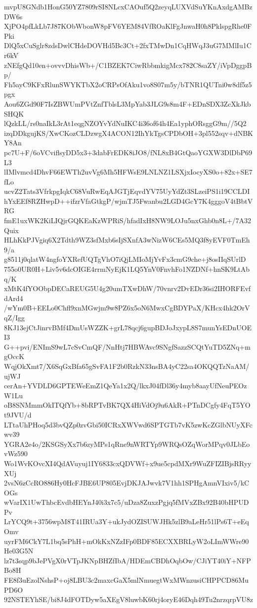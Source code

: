 mvpU8GNdb1HonG50YZ7809rSI8NLcxCAOuf5Q2zeyqLUXVdSuYKnAxdgAMBzDW6s
XjPO4pfLkLb7J87KObWbonW8pFV6YEM84VfROaKlFgJnwaH0h8PklspgRhe0FPki
DlQ5xCuSglr8zdsDwlCHdeDOVHd5Bc3Ct+2fxTMwDn1CqHWqJ3uG7MMlIu1Cr6kV
zNEfgQd10en+ovvvDhisWb+/C1BZEK7CiwRbbmkigMcx782C8saZY/iVpDggpBp/
Fh5ayC9KFxRlunSWYKTbX2oCRPsOfAku1vo8S07m5y/bTNR1QUTni0w8df5z5pgx
Aou6ZGd90F7IsZBWUmPVtZnfTblsL3MpYab3JLG9s8m4F+EDnSDX3ZcXkJkbSHQK
lQzkLL/rs0naIkL3rAt1eqgNZOYvYdNuIKC4i36of64h4Ea1yphORsggG9m//5Q2
izqDDkgujKS/XwCKozCLDzwgX4ACON12IhYkTgsCPDbOH+3pl552sqv+dNBKY8An
pc7U+F/6oVCviflsyDD5x3+3dabFrEDK8iJO8/fNL8xB4GtQaoYGXW3DlDbP69L3
lIMlvmcd4DhvF66EWTh2uvVg6Mh5HFWsE9LNLNZ1LSXjxIocyXS0o+82x+SE7fLo
ucvZ2Tats3VfrkpgIqkC68VuRwEqAJGTjEqvdYV75UyYdZt3SLzeiPS1i19CCLDI
hYxEEf8RZHwpD++ifzrVfaGtkgP/wjmTJ5Fwanbu2LGD4GcY7K4gggoV4tBbtVRG
fmE1uxWK2KiLIQjrGQKEaKzWPRiS/hfadIxH8NW9LOJu5nxGhb0n8L+/7A32Quix
HLhKkPJVgiq6X2Tdth9WZ3sfMxb6sIjSXnfA3wNizW6CEs5MQ3f8yEVF0TmEh9/a
g8511j0qlatW4ngfoYXRefUQTgVhO7iQjLMIoMjYvFx3cmG9che+j8osIIqSUrlD
755o0UR0H+Liv5v6dcOIGE4rrmNyEjK1LQ5YnV0FnvhFo1NZDNf+hnSK9LtAbq/K
xMtK4fYOObpDECaREUG5U4g20umTXwDhW/70vnrv2DvEDr36si2IHORFEvfdArd4
/wYm0B+EELo0Chfl9xnMGwjm9w8PZ6x5oN6MwxCgBDYPaX/KHcx4hk2OrVqZ/Igg
8KJ13ejCtJinrvBMf4DmUsWZZK+grL78qcj6gupBDJoJxypL8S7munYsEDnUOEI3
G++pvi/ENImS9wL7cSvCmQF/NnHtj7HBWAvc9SNgfSazzSCQtYuTD5ZNq+mgOccK
WqjOkXmt7/X6SqGxBfa65gSvFA1F2b0RzkN33nsBA4yC22sa4OKQQTzNaAM/ujWJ
cerAn+YVDLD6GPTEWeEmZ1QeYa1x2Q/lkxJ04fDl36y4myb8aayUfNeuPEOzW1Lu
oB8SNMmmOkITQfYb+8bRPTvBK7QX4HiVdOj9u6AkR+PTnDCgfy4FqT5YOt9JVU/d
LTtaUhPHoq5d3bvQZp0zvGbi50ICRxXWVwd6SPTGTb7vK5zwKcZGlbNUyXFcwv39
YGRA2e4o/2KSGSyXx7b6zyMPs1qRne9nWRTYp9WRQsOZqWorMPqv0JLbEovWz590
Wo1WvKOvcXI4QdAVuyuj1IY6833cxQDVWf+x9ue5cpdMXr9WuZFIZIBjsRRyyXUj
2vsN6zCcRO886Hy0HcFJBE6UP805EvjDKJAJwvk7V1hh1SPHgAmnVIxiv5/kCOGs
wVarIX1UwThbcEvdbHEYnJ40i3x7c5/uDza8ZuxzPgjq5fMVxZBx92B40bHPUDPv
LrYCQ9t+3756wpM8T41IRUa3Y+ukJydOZISUWJHk5zlB9aLeHr51lPs6T+eEqOmv
uyrFM6CkY7L1bq5sPhH+mOkKxNZzIFp0BDF85ECXXBRLyW2oLImWWre90He03G5N
lz7t3sqp9bJePVgX0rVTpJKNpBHZfIbA/HDEmCBDhOqbOw/CJiYT40iY+NFPBo8H
FE8f3uEzolNshsP+oj8LBU3c2maxcGaX5mlNmuegtWxMWnzusiCHPPCD86MuPD6O
92NSTEYhSE/bi8J4dFOTDyw5aXEgV8luwbK60rj4oryE46Dqh49Tu2nrzqrpVU8z
